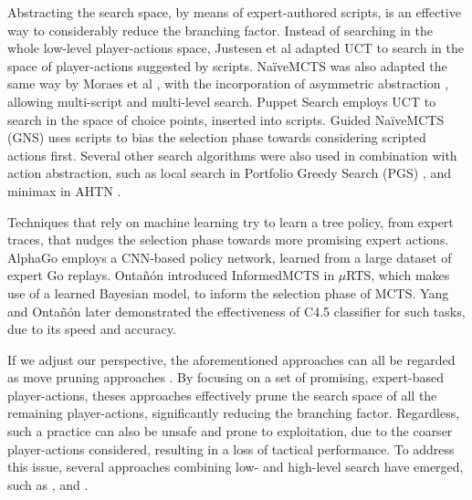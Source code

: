 \documentclass[conference]{IEEEtran}
\newcommand{\mRTS}{$\mu$RTS}
\begin{document}
Abstracting the search space, by means of expert-authored scripts, is an effective way to considerably reduce the branching factor. Instead of searching in the whole low-level player-actions space, Justesen et al \cite{justesen_script-_2014} adapted UCT to search in the space of player-actions suggested by scripts. NaïveMCTS was also adapted the same way by Moraes et al \cite{moraes_action_2018}, with the incorporation of asymmetric abstraction \cite{moraes_asymmetric_2018}, allowing multi-script and multi-level search. Puppet Search \cite{barriga_puppet_2015} employs UCT to search in the space of choice points, inserted into scripts. Guided NaïveMCTS (GNS) \cite{yang_guiding_2019} uses scripts to bias the selection phase towards considering scripted actions first. Several other search algorithms were also used in combination with action abstraction, such as local search in Portfolio Greedy Search (PGS) \cite{churchill_portfolio_2013}, and minimax in AHTN \cite{ontanon_adversarial_2015}.

Techniques that rely on machine learning try to learn a tree policy, from expert traces, that nudges the selection phase towards more promising expert actions. AlphaGo \cite{silver_mastering_2016} employs a CNN-based policy network, learned from a large dataset of expert Go replays. Ontañón introduced InformedMCTS in \mRTS{}, which makes use of a learned Bayesian model, to inform the selection phase of MCTS. Yang and Ontañón \cite{yang_extracting_2019} later demonstrated the effectiveness of C4.5 classifier for such tasks, due to its speed and accuracy.


If we adjust our perspective, the aforementioned approaches can all be regarded as move pruning approaches \cite{yang_integrating_2020}. By focusing on a set of promising, expert-based player-actions, theses approaches effectively prune the search space of all the remaining player-actions, significantly reducing the branching factor. Regardless, such a practice can also be unsafe and prone to exploitation, due to the coarser player-actions considered, resulting in a loss of tactical performance. To address this issue, several approaches combining low- and high-level search have emerged, such as \cite{barriga_combining_2017}, \cite{neufeld_hybrid_2019} and \cite{moraes_action_2018}.
\end{document}
